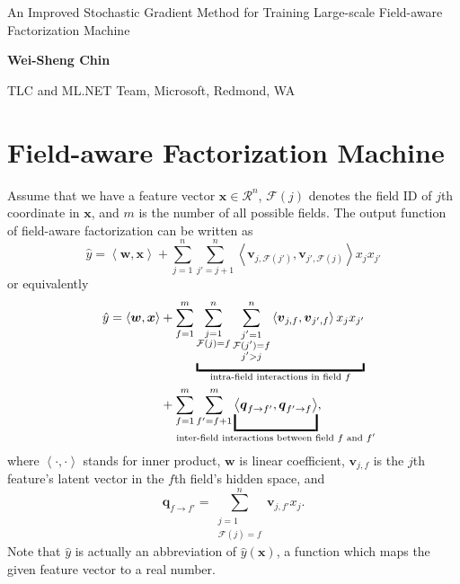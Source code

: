 \documentclass[11pt]{article}
\newcommand{\bsym}[1]{\ensuremath{\boldsymbol{#1}}}
\newcommand{\bw}{\ensuremath{\bsym{w}}}
\newcommand{\bv}{\ensuremath{\bsym{v}}}
\newcommand{\bx}{\ensuremath{\bsym{x}}}
\newcommand{\bq}{\ensuremath{\bsym{q}}}
\newcommand{\bbr}{\ensuremath{\mathcal R}}
\newcommand{\field}{\ensuremath{\mathcal F}}
\newcommand{\dotprod}[2]{\ensuremath{\left\langle #1,#2 \right\rangle}}
\begin{document}
\begin{center}
    {\Large An Improved Stochastic Gradient Method for Training Large-scale Field-aware Factorization Machine}
\end{center}
\begin{center}
    {\bf \large Wei-Sheng Chin}
\end{center}
\begin{center}
{TLC and ML.NET Team, Microsoft, Redmond, WA}\\
\end{center}

\section{Field-aware Factorization Machine}
Assume that we have a feature vector $\bx\in\bbr^n$, $\field(j)$ denotes the field ID of $j$th coordinate in $\bx$, and $m$ is the number of all possible fields.
The output function of field-aware factorization can be written as
\begin{equation*}
    \hat{y} = \dotprod{\bw}{\bx} + \sum_{j=1}^n \sum_{j'=j+1}^n \dotprod{\bv_{j, \field(j')}}{\bv_{j', \field(j)}} x_jx_{j'}
\end{equation*}
or equivalently
\begin{equation}
    \begin{aligned}
        \hat{y} = \dotprod{\bw}{\bx} &+ \sum_{f=1}^m \underbracket[1.5pt][5pt]{\sum_{\substack{j=1 \\ \field(j)=f}}^n \sum_{\substack{j'=1 \\ \field(j') = f \\ j' > j}}^n \dotprod{\bv_{j, f}}{\bv_{j', f}}x_jx_{j'}}_{\text{intra-field interactions in field $f$}} \\
                                 &+ \sum_{f=1}^m\sum_{f'=f+1}^m \underbracket[1.5pt][12pt]{\dotprod{\bq_{f\rightarrow f'}}{\bq_{f'\rightarrow f}}}_{\mathclap{\text{inter-field interactions between field $f$ and $f'$}}},
    \end{aligned}
    \label{eq:FfmOut}
\end{equation}
where $\dotprod{\cdot}{\cdot}$ stands for inner product, $\bw$ is linear coefficient, $\bv_{j, f}$ is the $j$th feature's latent vector in the $f$th field's hidden space, and
\begin{equation*}
    \bq_{f\rightarrow f'} = \sum_{ \substack{j=1 \\ \field(j)=f} }^n \bv_{j, f'} x_j.
\end{equation*}
Note that $\hat{y}$ is actually an abbreviation of $\hat{y}(\bx)$, a function which maps the given feature vector to a real number.
\end{document}
